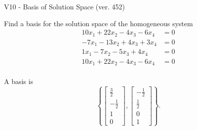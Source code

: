 \begin{exercise}
  \begin{exerciseTitle}V10 - Basis of Solution Space (ver. 452)\end{exerciseTitle}
  \begin{exerciseStatement}
    Find a basis for the solution space of the homogeneous system 
\begin{align*}
 10 x_ 1 + 22 x_ 2 -4 x_ 3 -6 x_ 4 &= 0  \\ 
  -7 x_ 1 -13 x_ 2 + 4 x_ 3 + 3 x_ 4 &= 0  \\ 
  1 x_ 1 -7 x_ 2 -5 x_ 3 + 4 x_ 4 &= 0  \\ 
  10 x_ 1 + 22 x_ 2 -4 x_ 3 -6 x_ 4 &= 0  \\ 
 \end{align*}


 
  \end{exerciseStatement}

  \begin{exerciseAnswer}
   A basis is   
\[\left\{\left[\begin{array}{c}
\frac{3}{2} \\
-\frac{1}{2} \\
1 \\
0
\end{array}\right] , \left[\begin{array}{c}
-\frac{1}{2} \\
\frac{1}{2} \\
0 \\
1
\end{array}\right]\right\}.\]

  


  \end{exerciseAnswer}
\end{exercise}